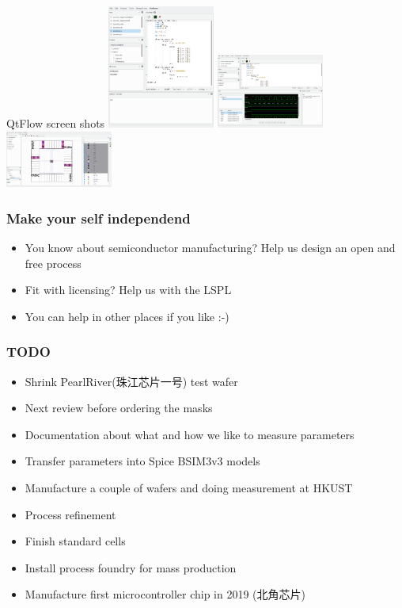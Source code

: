 \documentclass{beamer}
\begin{document}
\begin{frame}{QtFlow screen shots}
	\includegraphics[width=100pt]{Screenshot_20171218_044022.png}
	\includegraphics[width=100pt]{Screenshot_20171218_045118.png}
	\includegraphics[width=100pt]{Screenshot_20171218_045416.png}
\end{frame}

\begin{frame}
	\frametitle{Make your self independend}
	\begin{itemize}
		\item You know about semiconductor manufacturing? Help us design an open and free process
		\item Fit with licensing? Help us with the LSPL
		\item You can help in other places if you like :-)
	\end{itemize}
\end{frame}

\begin{frame}
	\frametitle{TODO}
	\begin{itemize}
		\item Shrink PearlRiver(\cjkfont 珠江芯片一号) test wafer
		\item Next review before ordering the masks
		\item Documentation about what and how we like to measure parameters
		\item Transfer parameters into Spice BSIM3v3 models
		\item Manufacture a couple of wafers and doing measurement at HKUST
		\item Process refinement
		\item Finish standard cells
		\item Install process foundry for mass production
		\item Manufacture first microcontroller chip in 2019 (\cjkfont 北角芯片)
	\end{itemize}
\end{frame}
\end{document}
